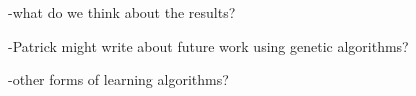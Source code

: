 -what do we think about the results?

-Patrick might write about future work using genetic algorithms?

-other forms of learning algorithms?